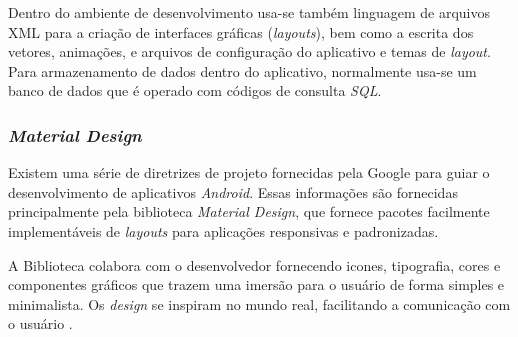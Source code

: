 Dentro do ambiente de desenvolvimento usa-se também linguagem de arquivos XML para a criação de interfaces gráficas (\textit{layouts}), bem como a escrita dos vetores, animações, e arquivos de configuração do aplicativo e temas de \textit{layout}. Para armazenamento de dados dentro do aplicativo, normalmente usa-se um banco de dados que é operado com códigos de consulta \textit{SQL}.

\subsubsection{\textit{Material Design}}
Existem uma série de diretrizes de projeto fornecidas pela Google para guiar o desenvolvimento de aplicativos \textit{Android}. Essas informações são fornecidas principalmente pela biblioteca \textit{Material Design}, que fornece pacotes facilmente implementáveis de \textit{layouts} para aplicações responsivas e padronizadas.

A Biblioteca colabora com o desenvolvedor fornecendo icones, tipografia, cores e componentes gráficos que trazem uma imersão para o usuário de forma simples e minimalista. Os \textit{design} se inspiram no mundo real, facilitando a comunicação com o usuário \cite{site:materialdesign}.



